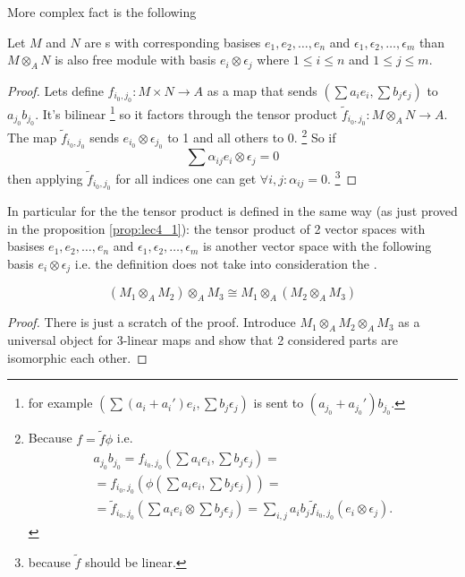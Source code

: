 More complex fact is the following
\begin{proposition}
  Let $M$ and $N$ are s
  with corresponding basises $e_1, e_2, \dots, e_n$ and
  $\epsilon_1, \epsilon_2, \dots, \epsilon_m$ than
  $M \otimes_A N$ is also free module with basis $e_i \otimes
  \epsilon_j$ where $1 \le i \le n$ and
  $1 \le j \le m$.
  \begin{proof}
    Lets define
    $f_{i_0,j_0}: M \times N \to A$ as a map that sends
    $\left(\sum a_i e_i, \sum b_j \epsilon_j\right)$ to
    $a_{j_0} b_{j_0}$. It's bilinear
    \footnote{
      for example
      $\left(\sum (a_i + a_i') e_i, \sum b_j \epsilon_j\right)$ is
      sent to  $(a_{j_0} + a_{j_0}') b_{j_0}$.
    }
    so it factors through the tensor product
    $\tilde{f}_{i_0, j_0} : M \otimes_A N \to A$. The map
    $\tilde{f}_{i_0, j_0}$ sends $e_{i_0} \otimes \epsilon_{j_0}$ to 1
    and all others to 0.
    \footnote{
      Because $f = \tilde{f} \phi$ i.e.
      \begin{eqnarray}
      a_{j_0} b_{j_0} =
      f_{i_0,j_0}\left(\sum a_i e_i, \sum b_j\epsilon_j\right) =
      \nonumber \\
      =  f_{i_0,j_0}\left(
      \phi\left(\sum a_i e_i, \sum b_j\epsilon_j\right)\right) = 
      \nonumber \\
      =
      \tilde{f}_{i_0,j_0}\left(\sum a_i e_i \otimes \sum b_j
      \epsilon_j\right) =
      \sum_{i,j} a_i b_j \tilde{f}_{i_0,j_0}(e_i \otimes \epsilon_j).
      \nonumber
      \end{eqnarray}
    }
    So if
    \[
    \sum \alpha_{ij} e_i \otimes \epsilon_j = 0
    \]
    then applying $\tilde{f}_{i_0, j_0}$ for all indices one can get
    $\forall i,j: \alpha_{ij} = 0$.
    \footnote{
      because $\tilde{f}$ should be linear.
    }
  \end{proof}
  \label{prop:lec4_1}
\end{proposition}

In particular for the  the tensor product is
defined in the same way (as just proved in the proposition
\ref{prop:lec4_1}): the tensor product of 2 vector spaces with
basises $e_1, e_2, \dots, e_n$ and
$\epsilon_1, \epsilon_2, \dots, \epsilon_m$ is another vector space
with the following basis $e_i \otimes \epsilon_j$ i.e. the definition
does not take into consideration the .

\begin{proposition}[Associative]
  \[
  \left(M_1 \otimes_A M_2\right) \otimes_A M_3
  \cong
  M_1 \otimes_A \left(M_2 \otimes_A M_3\right)
  \]
  \begin{proof}
    There is just a scratch of the proof.
    Introduce
    $M_1 \otimes_A M_2 \otimes_A M_3$
    as a universal object for 3-linear maps and show that 2 considered
    parts are isomorphic each other.
  \end{proof}
  \label{prop:lec4_Associative}
\end{proposition}

